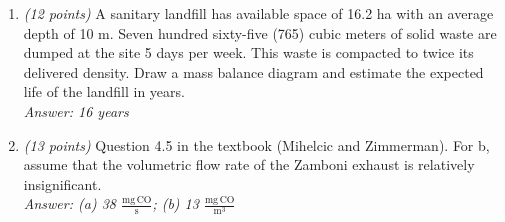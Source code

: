 \documentclass[12pt,letterpaper]{article}
\begin{document}
\begin{enumerate}
\item \emph{(12 points)} A sanitary landfill has available space of 16.2 ha with an average depth of 10 m.  Seven hundred sixty-five (765) cubic meters of solid waste are dumped at the site 5 days per week.  This waste is compacted to twice its delivered density. Draw a mass balance diagram and estimate the expected life of the landfill in years.\\\emph{Answer: 16 years}

\item \emph{(13 points)} Question 4.5 in the textbook (Mihelcic and Zimmerman).  For b, assume that the volumetric flow rate of the Zamboni exhaust is relatively insignificant.\\ \emph{Answer: (a) 38 $\mathrm{\frac{mg\, CO}{s}}$; (b) 13 $\mathrm{\frac{mg \, CO}{m^3}}$}

 
\end{enumerate}
\end{document}
